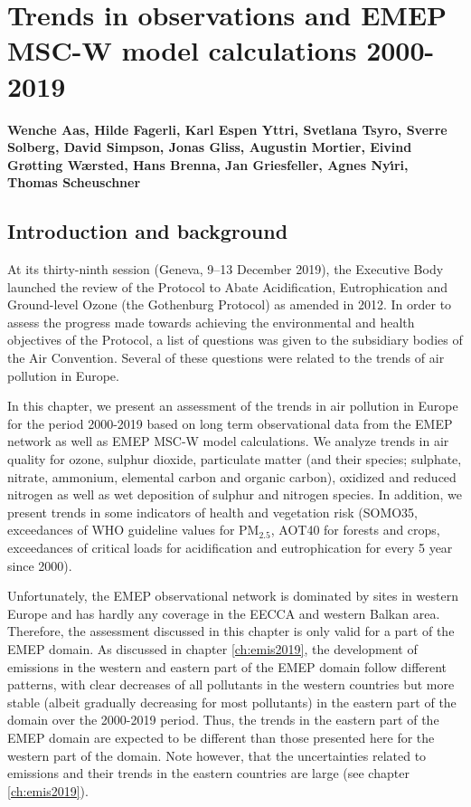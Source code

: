 \chapter[Trends]{Trends in observations and EMEP MSC-W model calculations 2000-2019}
\label{ch:Trends}

{\bf{Wenche Aas, Hilde Fagerli, Karl Espen Yttri, Svetlana Tsyro, Sverre Solberg, David Simpson, Jonas Gliss, Augustin Mortier, Eivind Grøtting Wærsted, Hans Brenna, Jan Griesfeller, Agnes Ny\'{\i}ri, Thomas Scheuschner}}\\



\section{\label{sec:Trends_introduction}Introduction and background}
At its thirty-ninth session (Geneva, 9–13 December 2019), the Executive Body launched the review of the Protocol to Abate Acidification, Eutrophication and Ground-level Ozone (the Gothenburg Protocol) as amended in 2012. In order to assess  the progress made towards achieving the environmental and health objectives of the Protocol, a
list of questions was given to the subsidiary bodies of the Air Convention. Several of these questions were related to the trends of air pollution in Europe. 

In this chapter, we present an assessment of the trends in air pollution in Europe for the period 2000-2019 based on long term observational data from the EMEP network as well as EMEP MSC-W model calculations. We analyze trends in air quality for ozone, sulphur dioxide, particulate matter (and their species; sulphate, nitrate, ammonium, elemental carbon and organic carbon), oxidized and reduced nitrogen as well as wet deposition of sulphur and nitrogen species. In addition, we present trends in some indicators of health and vegetation risk (SOMO35, exceedances of WHO guideline values for PM$_{2.5}$, AOT40 for forests and crops, exceedances of critical loads for acidification and eutrophication for every 5 year since 2000).

Unfortunately, the EMEP observational network is dominated by sites in western Europe and has hardly any coverage in the EECCA and western Balkan area. Therefore, the assessment discussed in this chapter is only valid for a part of the EMEP domain. As discussed in chapter \ref{ch:emis2019}, the development of emissions in the western and eastern part of the EMEP domain follow different patterns, with clear decreases of all pollutants in the western countries  but more stable (albeit gradually decreasing for most pollutants) in the eastern part of the domain over the 2000-2019 period. Thus, the trends in the eastern part of the EMEP domain are expected to be different than those presented here for the western part of the domain. Note however, that the uncertainties related to emissions and their trends in the eastern countries are large (see chapter \ref{ch:emis2019}).


